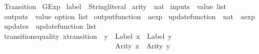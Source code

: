 %
\begin{isabellebody}%
%
%
\isadelimtheory
%
\endisadelimtheory
%
\isatagtheory
{}\isamarkupfalse%
\ Transition\isanewline
{}\ GExp\isanewline
{}%
\endisatagtheory
{\isafoldtheory}%
%
\isadelimtheory
\isanewline
%
\endisadelimtheory
\isanewline
{}\isamarkupfalse%
\ label\ {\isacharequal}\ String{\isachardot}literal\isanewline
{}\isamarkupfalse%
\ arity\ {\isacharequal}\ nat\isanewline
{}\isamarkupfalse%
\ inputs\ {\isacharequal}\ {\isachardoublequoteopen}value\ list{\isachardoublequoteclose}\isanewline
{}\isamarkupfalse%
\ outputs\ {\isacharequal}\ {\isachardoublequoteopen}value\ option\ list{\isachardoublequoteclose}\isanewline
{}\isamarkupfalse%
\ output{\isacharunderscore}function\ {\isacharequal}\ {\isachardoublequoteopen}aexp{\isachardoublequoteclose}\isanewline
{}\isamarkupfalse%
\ update{\isacharunderscore}function\ {\isacharequal}\ {\isachardoublequoteopen}{\isacharparenleft}nat\ {\isasymtimes}\ aexp{\isacharparenright}{\isachardoublequoteclose}\isanewline
{}\isamarkupfalse%
\ updates\ {\isacharequal}\ {\isachardoublequoteopen}update{\isacharunderscore}function\ list{\isachardoublequoteclose}%
\isamarkupfalse%
\ transition{\isacharunderscore}equality{\isacharcolon}\ {\isachardoublequoteopen}{\isacharparenleft}{\isacharparenleft}x{\isacharcolon}{\isacharcolon}transition{\isacharparenright}\ {\isacharequal}\ y{\isacharparenright}\ {\isacharequal}\ {\isacharparenleft}{\isacharparenleft}Label\ x{\isacharparenright}\ {\isacharequal}\ {\isacharparenleft}Label\ y{\isacharparenright}\ {\isasymand}\isanewline
\ \ \ \ \ \ \ \ \ \ \ \ \ \ \ \ \ \ \ \ \ \ \ \ \ \ \ \ \ \ \ \ {\isacharparenleft}Arity\ x{\isacharparenright}\ {\isacharequal}\ {\isacharparenleft}Arity\ y{\isacharparenright}\ {\isasymand}\isanewline

\end{isabellebody}
